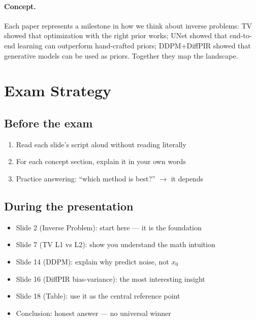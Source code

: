 \documentclass[english,11pt,a4paper]{article}
\begin{document}
\paragraph{Concept.}
Each paper represents a milestone in how we think about inverse
problems: TV showed that optimization with the right prior works;
UNet showed that end-to-end learning can outperform hand-crafted
priors; DDPM+DiffPIR showed that generative models can be used as
priors. Together they map the landscape.

\newpage
\section*{Exam Strategy}

\subsection*{Before the exam}
\begin{enumerate}
\item Read each slide's script aloud without reading literally
\item For each concept section, explain it in your own words
\item Practice answering: ``which method is best?'' $\to$ it depends
\end{enumerate}

\subsection*{During the presentation}
\begin{itemize}
\item Slide 2 (Inverse Problem): start here --- it is the foundation
\item Slide 7 (TV L1 vs L2): show you understand the math intuition
\item Slide 14 (DDPM): explain why predict noise, not $x_0$
\item Slide 16 (DiffPIR bias-variance): the most interesting insight
\item Slide 18 (Table): use it as the central reference point
\item Conclusion: honest answer --- no universal winner
\end{itemize}
\end{document}
